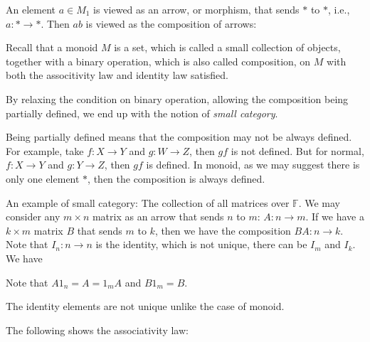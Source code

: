\documentclass[
	11pt, %
	fleqn, %
	a4paper, %
]{LegrandOrangeBook}
\newcommand{\F}{\mathbb{F}} %
\begin{document}
An element $a \in M_1$ is viewed as an arrow, or morphism, that sends $*$ to $*$, i.e., $a : * \to *$. Then $ab$ is viewed as the composition of arrows:
\begin{center}
\end{center}

Recall that a monoid $M$ is a set, which is called a small collection of objects, together with a binary operation, which is also called composition, on $M$ with both the associtivity law and identity law satisfied. 

By relaxing the condition on binary operation, allowing the composition being partially defined, we end up with the notion of \emph{small category}.

Being partially defined means that the composition may not be always defined. For example, take $f : X \to Y$ and $g : W \to Z$, then $gf$ is not defined. But for normal, $f : X \to Y$ and $g : Y \to Z$, then $gf$ is defined. In monoid, as we may suggest there is only one element $*$, then the composition is always defined.

An example of small category: The collection of all matrices over $\F$. We may consider any $m \times n$ matrix as an arrow that sends $n$ to $m$: $A : n \to m$. If we have a $k \times m$ matrix $B$ that sends $m$ to $k$, then we have the composition $BA : n \to k$. Note that $I_n : n \to n$ is the identity, which is not unique, there can be $I_m$ and $I_k$. We have 
\begin{center}
\end{center}
Note that $A 1_n = A = 1_m A$ and $B 1_m = B$. 

\begin{remark}
    The identity elements are not unique unlike the case of monoid.
\end{remark}

The following shows the associativity law:
\begin{center}
\end{center}
\end{document}
